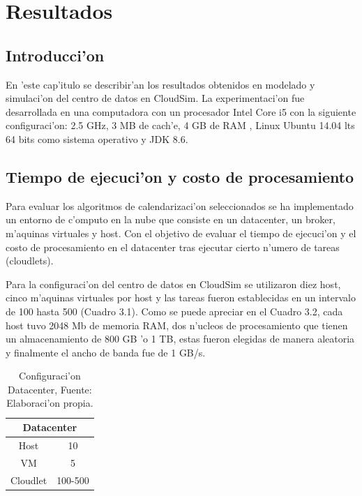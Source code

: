 \chapter{Resultados}
\section*{Introducci'on}

En 'este cap'itulo se describir'an los resultados obtenidos en modelado y simulaci'on del centro de datos en CloudSim. La experimentaci'on fue desarrollada en una computadora con  un procesador Intel Core i5  con la siguiente configuraci'on: 2.5 GHz, 3 MB de cach'e, 4 GB de RAM , Linux Ubuntu 14.04 lts 64 bits como sistema operativo y JDK 8.6.






\vspace{20em} 

\section{Tiempo de ejecuci'on y costo de procesamiento}


Para evaluar los algoritmos de calendarizaci'on seleccionados se ha implementado un entorno de c'omputo en la nube que consiste en un datacenter, un broker, m'aquinas virtuales y host.  Con el objetivo de evaluar el tiempo de ejecuci'on y el costo de procesamiento en el datacenter tras ejecutar cierto n'umero de tareas (cloudlets).




Para la configuraci'on del centro de datos en CloudSim se utilizaron diez host, cinco m'aquinas virtuales por host y las tareas fueron establecidas en un intervalo de 100 hasta 500 (Cuadro 3.1).
Como se puede apreciar en el Cuadro 3.2, cada host tuvo 2048 Mb de memoria RAM, dos n'ucleos de procesamiento que tienen un almacenamiento de 800 GB 'o 1 TB, estas fueron elegidas de manera aleatoria y finalmente el ancho de banda fue de 1 GB/s.


\begin{table}[!hbt]
 
	\centering
	\caption{Configuraci'on Datacenter, Fuente: Elaboraci'on propia.}
	\begin{tabular}{@{}cc@{}}
		\toprule
		\multicolumn{2}{c}{{\bf Datacenter}} \\ \midrule
		Host              & 10               \\
		VM                & 5                \\
		Cloudlet          & 100-500          \\ \bottomrule
	\end{tabular}
\end{table}
 
